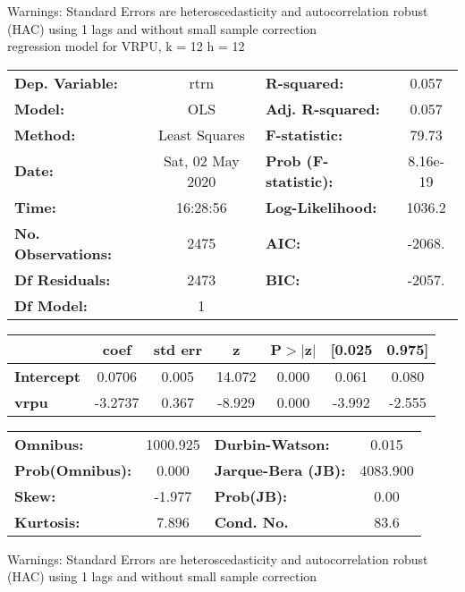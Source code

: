 Warnings: \newline
 [1] Standard Errors are heteroscedasticity and autocorrelation robust (HAC) using 1 lags and without small sample correction\\ 

regression model for VRPU, k = 12 h = 12\begin{center}
\begin{tabular}{lclc}
\toprule
\textbf{Dep. Variable:}    &       rtrn       & \textbf{  R-squared:         } &     0.057   \\
\textbf{Model:}            &       OLS        & \textbf{  Adj. R-squared:    } &     0.057   \\
\textbf{Method:}           &  Least Squares   & \textbf{  F-statistic:       } &     79.73   \\
\textbf{Date:}             & Sat, 02 May 2020 & \textbf{  Prob (F-statistic):} &  8.16e-19   \\
\textbf{Time:}             &     16:28:56     & \textbf{  Log-Likelihood:    } &    1036.2   \\
\textbf{No. Observations:} &        2475      & \textbf{  AIC:               } &    -2068.   \\
\textbf{Df Residuals:}     &        2473      & \textbf{  BIC:               } &    -2057.   \\
\textbf{Df Model:}         &           1      & \textbf{                     } &             \\
\bottomrule
\end{tabular}
\begin{tabular}{lcccccc}
                   & \textbf{coef} & \textbf{std err} & \textbf{z} & \textbf{P$> |$z$|$} & \textbf{[0.025} & \textbf{0.975]}  \\
\midrule
\textbf{Intercept} &       0.0706  &        0.005     &    14.072  &         0.000        &        0.061    &        0.080     \\
\textbf{vrpu}      &      -3.2737  &        0.367     &    -8.929  &         0.000        &       -3.992    &       -2.555     \\
\bottomrule
\end{tabular}
\begin{tabular}{lclc}
\textbf{Omnibus:}       & 1000.925 & \textbf{  Durbin-Watson:     } &    0.015  \\
\textbf{Prob(Omnibus):} &   0.000  & \textbf{  Jarque-Bera (JB):  } & 4083.900  \\
\textbf{Skew:}          &  -1.977  & \textbf{  Prob(JB):          } &     0.00  \\
\textbf{Kurtosis:}      &   7.896  & \textbf{  Cond. No.          } &     83.6  \\
\bottomrule
\end{tabular}
\end{center}

Warnings: \newline
 [1] Standard Errors are heteroscedasticity and autocorrelation robust (HAC) using 1 lags and without small sample correction\\ 

